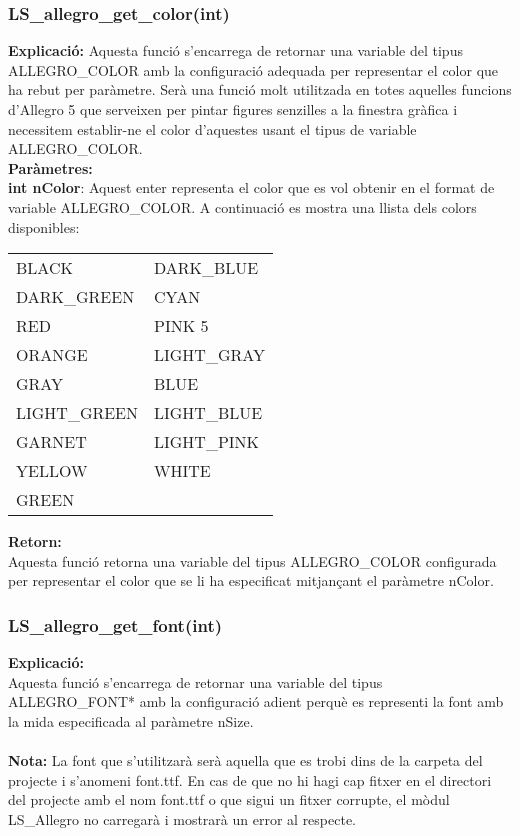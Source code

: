 \documentclass[11pt]{article}
\begin{document}
\pagebreak
\subsubsection{LS\_allegro\_get\_color(int)}
\textbf{Explicació:}
Aquesta funció s'encarrega de retornar una variable del tipus ALLEGRO\_COLOR amb la configuració adequada per representar el color que ha rebut per paràmetre. Serà una funció molt utilitzada en totes aquelles funcions d'Allegro 5 que serveixen per pintar figures senzilles a la finestra gràfica i necessitem establir-ne el color d'aquestes usant el tipus de variable ALLEGRO\_COLOR.\\

\noindent \textbf{Paràmetres:}\\
\textbf{int nColor}: Aquest enter representa el color que es vol obtenir en el format de variable ALLEGRO\_COLOR. A continuació es mostra una llista dels colors disponibles:
\begin{center}
	\begin{tabular}{l|l}
		BLACK  & DARK\_BLUE \\
		DARK\_GREEN & CYAN \\
		RED  &  PINK 5 \\
		ORANGE  & LIGHT\_GRAY \\
		GRAY & BLUE \\
		LIGHT\_GREEN  & LIGHT\_BLUE \\
		GARNET  & LIGHT\_PINK \\
		YELLOW & WHITE \\
		GREEN \\
	\end{tabular}
\end{center}

\noindent \textbf{Retorn:} \\
Aquesta funció retorna una variable del tipus ALLEGRO\_COLOR configurada per representar el color que se li ha especificat mitjançant el paràmetre nColor.
   
\pagebreak		
\subsubsection{LS\_allegro\_get\_font(int)}
\textbf{Explicació:}\\
Aquesta funció s'encarrega de retornar una variable del tipus ALLEGRO\_FONT* amb la configuració adient perquè es representi la font amb la mida especificada al paràmetre nSize.\\\\
\textbf{Nota:} La font que s'utilitzarà serà aquella que es trobi dins de la carpeta del projecte i s'anomeni font.ttf. En cas de que no hi hagi cap fitxer en el directori del projecte amb el nom font.ttf o que sigui un fitxer corrupte, el mòdul LS\_Allegro no carregarà i mostrarà un error al respecte.
	
\end{document}
